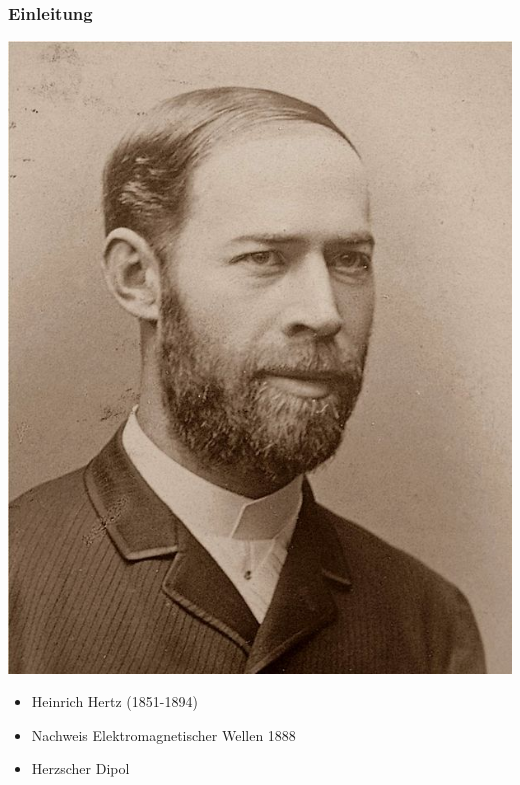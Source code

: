 \begin{frame}
	\frametitle{Einleitung}
\begin{minipage}{0.49\textwidth}
	\includegraphics[width=1\textwidth]{e11/HEINRICH_HERTZ.jpg}
	\tiny \hyperlink{refs}{\cite{wc}}
\end{minipage}
\begin{minipage}{0.49\textwidth}
	\begin{itemize}
		\item Heinrich Hertz (1851-1894)
		\item Nachweis Elektromagnetischer Wellen 1888	
		\item Herzscher Dipol
	\end{itemize}
\end{minipage}
\end{frame}

